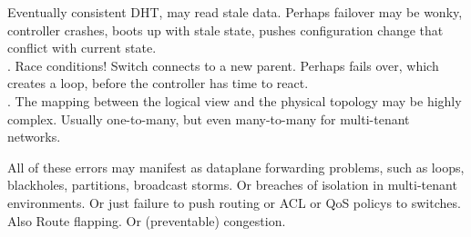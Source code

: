  Eventually consistent
DHT, may read stale data. Perhaps failover may be wonky, controller crashes,
boots up with stale state, pushes configuration change that conflict with
current state. \\
. Race conditions!
Switch connects to a new parent. Perhaps fails over, which creates a loop, 
before the controller has time to react. \\
. The mapping between the logical view and
the physical topology may be highly complex. Usually one-to-many, but even
many-to-many for multi-tenant networks. 

All of these errors may manifest as dataplane forwarding problems, such as
loops, blackholes, partitions, broadcast storms. Or breaches of isolation in
multi-tenant environments. Or just failure to push routing or ACL or QoS
policys to switches. Also Route flapping. Or (preventable) congestion.

